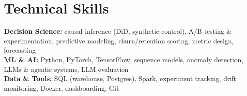 \documentclass[10pt]{article}
\begin{document}
\section{Technical Skills}
\textbf{Decision Science:} causal inference (DiD, synthetic control), A/B testing \& experimentation, predictive modeling, churn/retention scoring, metric design, forecasting\\
\textbf{ML \& AI:} Python, PyTorch, TensorFlow, sequence models, anomaly detection, LLMs \& agentic systems, LLM evaluation\\
\textbf{Data \& Tools:} SQL (warehouse, Postgres), Spark, experiment tracking, drift monitoring, Docker, dashboarding, Git
\end{document}
